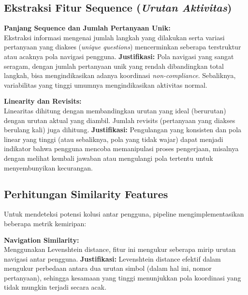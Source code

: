 \subsection{Ekstraksi Fitur Sequence (\textit{Urutan Aktivitas})}
\label{sec:ekstraksiFiturSequence}
\textbf{Panjang Sequence dan Jumlah Pertanyaan Unik:} \\
Ekstraksi informasi mengenai jumlah langkah yang dilakukan serta variasi pertanyaan yang diakses (\textit{unique questions}) mencerminkan seberapa terstruktur atau acaknya pola navigasi pengguna.
\textbf{Justifikasi:} Pola navigasi yang sangat seragam, dengan jumlah pertanyaan unik yang rendah dibandingkan total langkah, bisa mengindikasikan adanya koordinasi \textit{non-compliance}. Sebaliknya, variabilitas yang tinggi umumnya mengindikasikan aktivitas normal.

\textbf{Linearity dan Revisits:} \\
Linearitas dihitung dengan membandingkan urutan yang ideal (berurutan) dengan urutan aktual yang diambil. Jumlah revisits (pertanyaan yang diakses berulang kali) juga dihitung.
\textbf{Justifikasi:} Pengulangan yang konsisten dan pola linear yang tinggi (atau sebaliknya, pola yang tidak wajar) dapat menjadi indikator bahwa pengguna mencoba memanipulasi proses pengerjaan, misalnya dengan melihat kembali jawaban atau mengulangi pola tertentu untuk menyembunyikan kecurangan.

\subsection{Perhitungan Similarity Features}
\label{sec:perhitunganSimilarityFeatures}
Untuk mendeteksi potensi kolusi antar pengguna, pipeline mengimplementasikan beberapa metrik kemiripan:

\textbf{Navigation Similarity:} \\
Menggunakan Levenshtein distance, fitur ini mengukur seberapa mirip urutan navigasi antar pengguna.
\textbf{Justifikasi:} Levenshtein distance efektif dalam mengukur perbedaan antara dua urutan simbol (dalam hal ini, nomor pertanyaan), sehingga kesamaan yang tinggi menunjukkan pola koordinasi yang tidak mungkin terjadi secara acak.

